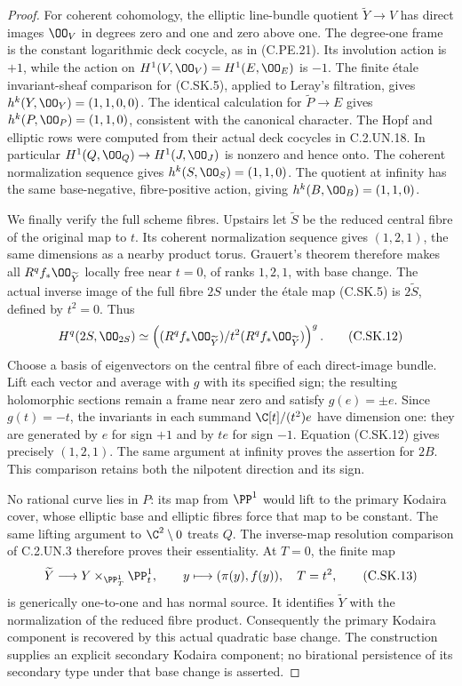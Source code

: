 \begin{proof}
For coherent cohomology, the elliptic
line-bundle quotient $\widetilde Y\to V$
has direct images $\OO_V$ in degrees
zero and one and zero above one. The
degree-one frame is the constant
logarithmic deck cocycle, as in
(C.PE.21). Its involution action is
$+1$, while the action on
$H^1(V,\OO_V)=H^1(E,\OO_E)$ is $-1$.
The finite \'etale invariant-sheaf
comparison for (C.SK.5), applied to
Leray's filtration, gives
$h^k(Y,\OO_Y)=(1,1,0,0)$. The identical
calculation for $\widetilde P\to E$
gives $h^k(P,\OO_P)=(1,1,0)$, consistent
with the canonical character.
The Hopf and elliptic rows were
computed from their actual deck cocycles
in C.2.UN.18. In particular
$H^1(Q,\OO_Q)\to H^1(J,\OO_J)$ is
nonzero and hence onto. The coherent
normalization sequence gives
$h^k(S,\OO_S)=(1,1,0)$. The quotient
at infinity has the same base-negative,
fibre-positive action, giving
$h^k(B,\OO_B)=(1,1,0)$.

We finally verify the full scheme fibres.
Upstairs let $\widetilde S$ be the
reduced central fibre of the original
map to $t$. Its coherent normalization
sequence gives $(1,2,1)$, the same
dimensions as a nearby product torus.
Grauert's theorem therefore makes all
$R^qf_*\OO_{\widetilde Y}$ locally free
near $t=0$, of ranks $1,2,1$, with
base change. The actual inverse image
of the full fibre $2S$ under the
\'etale map (C.SK.5) is $2\widetilde S$,
defined by $t^2=0$. Thus
\[
 H^q(2S,\OO_{2S})
  \simeq
 \left((R^qf_*\OO_{\widetilde Y})/
                   t^2(R^qf_*\OO_{\widetilde Y})\right)^g .
                                                            \tag{C.SK.12}
\]
Choose a basis of eigenvectors on the
central fibre of each direct-image
bundle. Lift each vector and average
with $g$ with its specified sign; the
resulting holomorphic sections remain
a frame near zero and satisfy
$g(e)=\pm e$. Since $g(t)=-t$, the
invariants in each summand
$\C[t]/(t^2)e$ have dimension one:
they are generated by $e$ for sign
$+1$ and by $te$ for sign $-1$.
Equation (C.SK.12) gives precisely
$(1,2,1)$. The same argument at
infinity proves the assertion for
$2B$. This comparison retains both
the nilpotent direction and its sign.

No rational curve lies in $P$:
its map from $\PP^1$ would lift to
the primary Kodaira cover, whose
elliptic base and elliptic fibres
force that map to be constant.
The same lifting argument to
$\C^2\setminus0$ treats $Q$.
The inverse-map resolution comparison
of C.2.UN.3 therefore proves their
essentiality. At $T=0$, the finite
map
\[
 \widetilde Y\longrightarrow
             Y\times_{\PP^1_T}\PP^1_t,\qquad
 y\longmapsto(\pi(y),f(y)),\quad T=t^2,
                                                            \tag{C.SK.13}
\]
is generically one-to-one and has
normal source. It identifies
$\widetilde Y$ with the normalization
of the reduced fibre product.
Consequently the primary Kodaira
component is recovered by this
actual quadratic base change.
The construction supplies an
explicit secondary Kodaira component;
no birational persistence of its
secondary type under that base change
is asserted.
\end{proof}
